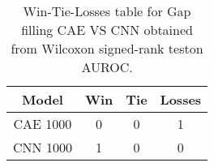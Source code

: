 \begin{table}[H]
\centering
\begin{tabular}{|c|c|c|c|}

\textbf{Model} &  \textbf{Win} &  \textbf{Tie} &  \textbf{Losses} \\
\hline

      CAE 1000 &             0 &             0 &                1 \\
\hline
      CNN 1000 &             1 &             0 &                0 \\
\hline

\end{tabular}
\caption{Win-Tie-Losses table for Gap filling CAE VS CNN obtained from Wilcoxon signed-rank teston AUROC.}
\label{tab:gap_filling_cae_vs_cnn_model_comparison}
\end{table}